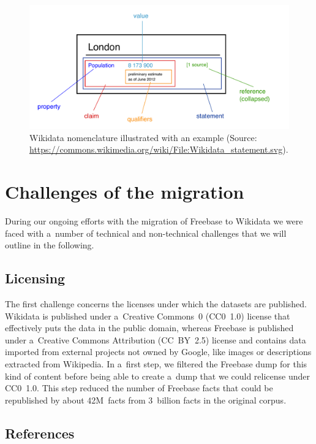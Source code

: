 \documentclass{acm_proc_article-sp}
\begin{document}
\begin{figure}[!htbp]
\centering
\includegraphics[width=8.45 cm]{img/Wikidata_statement.pdf}
\caption{Wikidata nomenclature illustrated with an example (Source:
	\url{https://commons.wikimedia.org/wiki/File:Wikidata_statement.svg}).}
\label{fig:statement}
\end{figure}

\section{Challenges of the migration}\label{sec:challenges-of-the-migration}

During our ongoing efforts with the migration of Freebase to Wikidata
we were faced with a~number of technical and non-technical challenges
that we will outline in the following.

\subsection{Licensing}
\label{sec:licensing}

The first challenge concerns the licenses under which the datasets are published.
Wikidata is published under a~Creative Commons~0 (CC0~1.0) license
that effectively puts the data in the public domain,
whereas Freebase is published under a~Creative Commons Attribution (CC~BY~2.5) license
and contains data imported from external projects not owned by Google,
like images or descriptions extracted from Wikipedia.
In a~first step, we filtered the Freebase dump for this kind of content
before being able to create a~dump that we could relicense under CC0~1.0.
This step reduced the number of Freebase facts that could be republished by about 42M~facts
from 3~billion facts in the original corpus.

\subsection{References}
\end{document}
